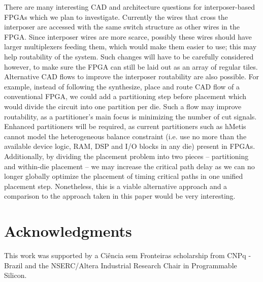 \documentclass{sig-alternate-2013}
\begin{document}
There are many interesting CAD and architecture questions for interposer-based FPGAs which we plan to investigate.  Currently the wires that cross the interposer are accessed with the same switch structure as other wires in the FPGA. Since interposer wires are more scarce, possibly these wires should have larger multiplexers feeding them, which would make them easier to use; this may help routability of the system. Such changes will have to be carefully considered however, to make sure the FPGA can still be laid out as an array of regular tiles. Alternative CAD flows to improve the interposer routability are also possible. For example, instead of following the synthesize, place and route CAD flow of a conventional FPGA, we could add a partitioning step before placement which would divide the circuit into one partition per die. Such a flow may improve routability, as a partitioner's main focus is minimizing the number of cut signals. Enhanced partitioners will be required, as current partitioners such as hMetis~\cite{hMetis} cannot model the heterogeneous balance constraint (i.e. use no more than the available device logic, RAM, DSP and I/O blocks in any die) present in FPGAs. Additionally, by dividing the placement problem into two pieces -- partitioning and within-die placement -- we may increase the critical path delay as we can no longer globally optimize the placement of timing critical paths in one unified placement step. Nonetheless, this is a viable alternative approach and a comparison to the approach taken in this paper would be very interesting.

\section{Acknowledgments}

This work was supported by a Ci\^{e}ncia sem Fronteiras scholarship from CNPq - Brazil and the NSERC/Altera Industrial Research Chair in Programmable Silicon.
%



\balancecolumns
\end{document}
